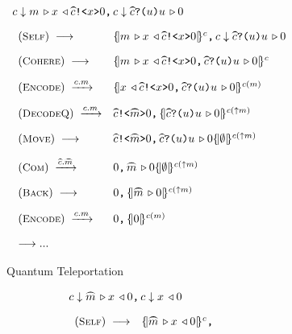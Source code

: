 \begin{figure}[t]
{\hspace*{-1em}
\begin{subfigure}[t]{0.57\textwidth}
{\footnotesize
\[
\begin{array}{l}
\pard{\down{c}{\encode{m}\decode{x}{\csend{\wideparen{c}}{x}{0}}}}{
\down{c}{\crev{\wideparen{c}}{u}{\encode{u}0}}
}
\\[1em]
\begin{array}{ll}
(\rulelab{Self})\;
\longrightarrow
&
\pard{\pscell{\encode{m}\decode{x}{\csend{\wideparen{c}}{x}{0}}}{c}}
{\down{c}{\crev{\wideparen{c}}{u}{\encode{u}0}}}

\\[1em]
(\rulelab{Cohere})\;
\longrightarrow
&
\pscell{\pard{\encode{m}\decode{x}{\csend{\wideparen{c}}{x}{0}}}{\crev{\wideparen{c}}{u}{\encode{u}0}}}{c}
\\[1em]
(\rulelab{Encode})\;
\xrightarrow{c.m}
&
\pscell{\pard{{\decode{x}{\csend{\wideparen{c}}{x}{0}}}}{\crev{\wideparen{c}}{u}{\encode{u}0}}}{c(m)}
\\[1em]
(\rulelab{DecodeQ})\;
\xrightarrow{c.m}
&
\pard{\csend{\wideparen{c}}{\wideparen{m}}{0}}
{\pscell{{\crev{\wideparen{c}}{u}{\encode{u}0}}}{c(\up{m})}}
\\[1em]
(\rulelab{Move})\;
\longrightarrow
&
\pard{\csend{\wideparen{c}}{\wideparen{m}}{0}}
{{\crev{\wideparen{c}}{u}{\encode{u}0}}\pscell{\emptyset}{c(\up{m})}}
\\[1em]
(\rulelab{Com})\;
\xrightarrow{\wideparen{c}.\wideparen{m}}
&
\pard{0}
{{{\encode{\wideparen{m}}0}}\pscell{\emptyset}{c(\up{m})}}
\\[1em]
(\rulelab{Back})\;
\longrightarrow
&
\pard{0}
{\pscell{{{\encode{\wideparen{m}}0}}}{c(\up{m})}}
\\[1em]
(\rulelab{Encode})\;
\xrightarrow{c.m}
&
\pard{0}
{\pscell{{{0}}}{c(m)}}
\\[1em]
\longrightarrow...
\end{array}
\end{array}
\]
}
\caption{Quantum Teleportation}
  \label{fig:tele-example}
\end{subfigure}
%
\begin{subfigure}[t]{0.38\textwidth}
{\footnotesize
\[
\begin{array}{l}
\pard{\down{c}{\encode{\wideparen{m}}\decode{x}{0}}}{
\down{c}{\decode{x}{0}}
}
\\[1em]
\begin{array}{ll}
(\rulelab{Self})\;
\longrightarrow
&
\pard{\pscell{\encode{\wideparen{m}}\decode{x}{0}}{c}}{
}
\end{array}
\end{array}\]}
\end{subfigure}}
\end{figure}
